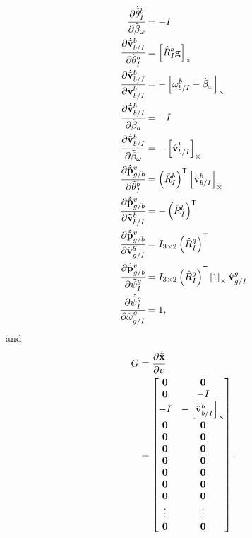 \begin{align}
      \cfrac{ \partial \dot{\tilde{\mathrm{\mathbf{\theta}}}}_I^{b} }{ \partial \tilde{\mathrm{\mathbf{\beta}}}_{\omega} }
    &=
      -I \\
      \cfrac{ \partial \dot{\tilde{\mathrm{\mathbf{v}}}}_{b/I}^b }{ \partial \tilde{\mathrm{\mathbf{\theta}}}_I^{b} }
    &=
      \left[  \hat{R}_I^b \mathrm{\mathbf{g}}  \right]_{\times} \\
      \cfrac{ \partial \dot{\tilde{\mathrm{\mathbf{v}}}}_{b/I}^b }{ \partial \tilde{\mathrm{\mathbf{v}}}_{b/I}^b }
    &=
      -\left[  \bar{\omega}_{b/I}^b - \hat{\mathrm{\mathbf{\beta}}}_\omega  \right]_{\times} \\
      \cfrac{ \partial \dot{\tilde{\mathrm{\mathbf{v}}}}_{b/I}^b }{ \partial \tilde{\mathrm{\mathbf{\beta}}}_a }
    &=
      -I \\
      \cfrac{ \partial \dot{\tilde{\mathrm{\mathbf{v}}}}_{b/I}^b }{ \partial \tilde{\mathrm{\mathbf{\beta}}}_{\omega} }
    &=
      -\left[  \hat{\mathrm{\mathbf{v}}}_{b/I}^b  \right]_{\times} \\
      \cfrac{ \partial \dot{\tilde{\mathrm{\mathbf{p}}}}_{g/b}^{v} }{ \partial \tilde{\mathrm{\mathbf{\theta}}}_I^{b} }
    &=
      \left( \hat{R}_{I}^{b} \right)^{\mathsf{T}}
      \left[  \hat{\mathrm{\mathbf{v}}}_{b/I}^{b}  \right]_{\times} \\
      \cfrac{ \partial \dot{\tilde{\mathrm{\mathbf{p}}}}_{g/b}^{v} }{ \partial \tilde{\mathrm{\mathbf{v}}}_{b/I}^b }
    &=
      -\left( \hat{R}_{I}^{b} \right)^{\mathsf{T}} \\
      \cfrac{ \partial \dot{\tilde{\mathrm{\mathbf{p}}}}_{g/b}^{v} }{ \partial \tilde{\mathrm{\mathbf{v}}}_{g/I}^{g} }
    &=
      I_{3 \times 2} \left( \hat{R}_{I}^{g} \right)^{\mathsf{T}} \\
      \cfrac{ \partial \dot{\tilde{\mathrm{\mathbf{p}}}}_{g/b}^{v} }{ \partial \tilde{\psi}_{I}^{g} }
    &=
               I_{3 \times 2} \left( \hat{R}_{I}^{g} \right)^{\mathsf{T}}
               \left[  1  \right]_{\times} \hat{\mathrm{\mathbf{v}}}_{g/I}^g \\
               \cfrac{ \partial \dot{\tilde{\psi}}_{I}^{g} }{ \partial \tilde{\omega}_{g/I}^{g} }
    &=
      1 ,
\end{align}
and
\begin{align}
  G &= \frac{ \partial \dot{\tilde{\mathrm{\mathbf{x}}}} }{ \partial \mathrm{\mathbf{\upsilon}} } \\
    &=
    \begin{bmatrix}
      \mathrm{\mathbf{0}} & \mathrm{\mathbf{0}} \\
      \mathrm{\mathbf{0}} & -I \\
      -I & -\left[ \hat{\mathrm{\mathbf{v}}}_{b/I}^b \right]_{\times} \\
      \mathrm{\mathbf{0}} & \mathrm{\mathbf{0}} \\
      \mathrm{\mathbf{0}} & \mathrm{\mathbf{0}} \\
      \mathrm{\mathbf{0}} & \mathrm{\mathbf{0}} \\
      \mathrm{\mathbf{0}} & \mathrm{\mathbf{0}} \\
      \mathrm{\mathbf{0}} & \mathrm{\mathbf{0}} \\
      \mathrm{\mathbf{0}} & \mathrm{\mathbf{0}} \\
      \mathrm{\mathbf{0}} & \mathrm{\mathbf{0}} \\
      \vdots & \vdots \\
      \mathrm{\mathbf{0}} & \mathrm{\mathbf{0}} 
    \end{bmatrix}.
\end{align}
